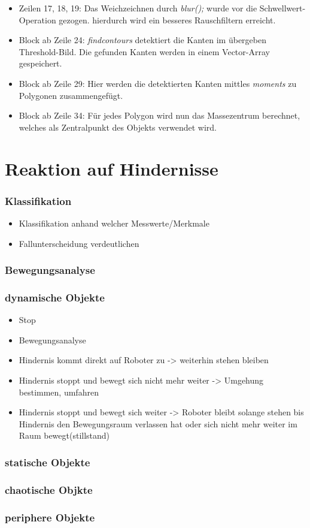 	\begin{itemize}
	\item Zeilen 17, 18, 19: Das Weichzeichnen durch \textit{blur();} wurde vor die Schwellwert-Operation gezogen. hierdurch wird ein besseres Rauschfiltern erreicht.
	\item Block ab Zeile 24: \textit{findcontours} detektiert die Kanten im übergeben Threshold-Bild. Die gefunden Kanten werden in einem Vector-Array gespeichert.
	\item Block ab Zeile 29: Hier werden die detektierten Kanten mittles \textit{moments} zu Polygonen zusammengefügt.
	\item Block ab Zeile 34: Für jedes Polygon wird nun das Massezentrum berechnet, welches als Zentralpunkt des Objekts verwendet wird.
	\end{itemize}
	\cite{cv-findcontours}
		
\chapter{Reaktion auf Hindernisse}

\begin{itemize}



\end{itemize}
\subsection{Klassifikation}
\begin{itemize}
\item Klassifikation anhand welcher Messwerte/Merkmale
\item Fallunterscheidung verdeutlichen
\end{itemize}
\subsection{Bewegungsanalyse}
\subsection{dynamische Objekte}
		\begin{itemize}
		\item Stop
		\item Bewegungsanalyse
		\item Hindernis kommt direkt auf Roboter zu -> weiterhin stehen bleiben
		\item Hindernis stoppt und bewegt sich nicht mehr weiter -> Umgehung bestimmen, umfahren
		\item Hindernis stoppt und bewegt sich weiter -> Roboter bleibt solange stehen bis Hindernis den Bewegungsraum verlassen hat oder sich nicht mehr weiter im Raum bewegt(stillstand) 
		\end{itemize}
	\subsection{statische Objekte}
	\subsection{chaotische Objkte}
	\subsection{periphere Objekte}
